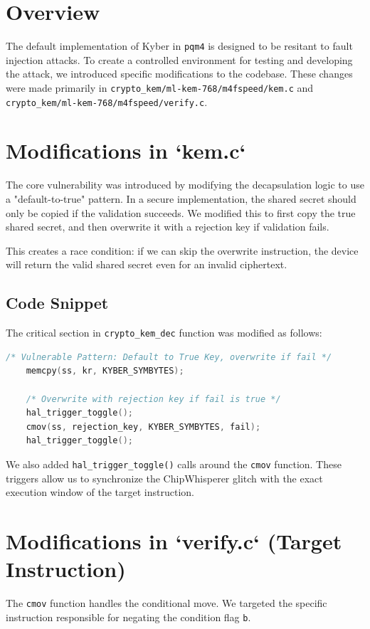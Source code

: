 \section{Overview}
The default implementation of Kyber in \texttt{pqm4} is designed to be resitant to fault injection attacks. To create a controlled environment for testing and developing the attack, we introduced specific modifications to the codebase. These changes were made primarily in \texttt{crypto\_kem/ml-kem-768/m4fspeed/kem.c} and \texttt{crypto\_kem/ml-kem-768/m4fspeed/verify.c}.

\section{Modifications in `kem.c`}
The core vulnerability was introduced by modifying the decapsulation logic to use a "default-to-true" pattern. In a secure implementation, the shared secret should only be copied if the validation succeeds. We modified this to first copy the true shared secret, and then overwrite it with a rejection key if validation fails.

This creates a race condition: if we can skip the overwrite instruction, the device will return the valid shared secret even for an invalid ciphertext.

\subsection{Code Snippet}
The critical section in \texttt{crypto\_kem\_dec} function was modified as follows:

\begin{lstlisting}[language=C]
    /* Vulnerable Pattern: Default to True Key, overwrite if fail */
    memcpy(ss, kr, KYBER_SYMBYTES);

    /* Overwrite with rejection key if fail is true */
    hal_trigger_toggle();
    cmov(ss, rejection_key, KYBER_SYMBYTES, fail);
    hal_trigger_toggle();
\end{lstlisting}

We also added \texttt{hal\_trigger\_toggle()} calls around the \texttt{cmov} function. These triggers allow us to synchronize the ChipWhisperer glitch with the exact execution window of the target instruction.

\section{Modifications in `verify.c` (Target Instruction)}
The \texttt{cmov} function handles the conditional move. We targeted the specific instruction responsible for negating the condition flag \texttt{b}.

